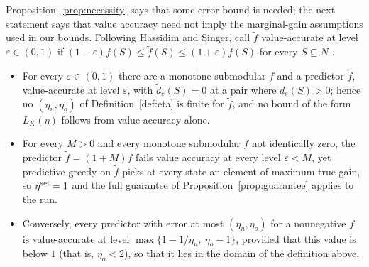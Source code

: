 Proposition~\ref{prop:necessity} says that some error bound is needed; the
next statement says that value accuracy need not imply the marginal-gain
assumptions used in our bounds.  Following Hassidim and Singer, call
$\tilde f$ value-accurate at
level $\varepsilon\in(0,1)$ if
$(1-\varepsilon)f(S)\le\tilde f(S)\le(1+\varepsilon)f(S)$ for every
$S\subseteq N$ \citep{hassidim2017submodular}.

\begin{proposition}
\label{prop:valueacc}\mbox{}
\begin{itemize}
\item[(i)] For every $\varepsilon\in(0,1)$ there are a monotone submodular
$f$ and a predictor $\tilde f$, value-accurate at level $\varepsilon$, with
$\tilde d_e(S)=0$ at a pair where $d_e(S)>0$; hence no
$(\eta_u,\eta_o)$ of Definition~\ref{def:eta} is finite for $\tilde f$, and
no bound of the form $L_K(\eta)$ follows from value accuracy alone.
\item[(ii)] For every $M>0$ and every monotone submodular $f$ not
identically zero, the predictor $\tilde f=(1+M)f$ fails value accuracy at
every level $\varepsilon<M$, yet predictive greedy on $\tilde f$ picks at
every state an element of maximum true gain, so $\eta^{\mathrm{sel}}=1$ and the full
guarantee of Proposition~\ref{prop:guarantee} applies to the run.
\item[(iii)] Conversely, every predictor with error at most
$(\eta_u,\eta_o)$ for a nonnegative $f$ is value-accurate at level
$\max\{1-1/\eta_u,\ \eta_o-1\}$, provided that this value is below $1$
(that is, $\eta_o<2$), so that it lies in the domain of the definition
above.
\end{itemize}
\end{proposition}

